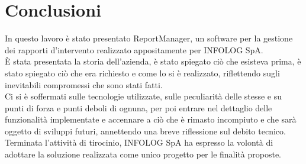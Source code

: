 \chapter{Conclusioni}\label{c:conclusions}

In questo lavoro è stato presentato ReportManager, un software per la gestione dei rapporti d'intervento
realizzato appositamente per INFOLOG SpA.
\\
È stata presentata la storia dell'azienda, è stato spiegato ciò che esisteva prima, è stato spiegato ciò che
era richiesto e come lo si è realizzato, riflettendo sugli inevitabili compromessi che sono stati fatti.
\\
Ci si è soffermati sulle tecnologie utilizzate, sulle peculiarità delle stesse e su punti di forza e punti
deboli di ognuna, per poi entrare nel dettaglio delle funzionalità implementate e accennare a ciò che è rimasto
incompiuto e che sarà oggetto di sviluppi futuri, annettendo una breve riflessione sul debito tecnico.
\\
Terminata l'attività di tirocinio, INFOLOG SpA ha espresso la volontà di adottare la soluzione realizzata
come unico progetto per le finalità proposte.